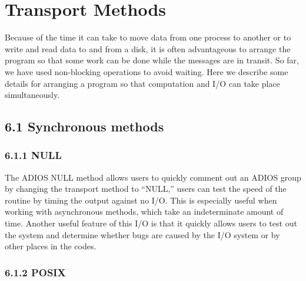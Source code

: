 \vspace{22pt}
\section{Transport Methods}

\vspace{24pt}
\leftskip=0pt
Because of the time it can take to move data from one process to another or to 
write and read data to and from a disk, it is often advantageous to arrange the 
program so that some work can be done while the messages are in transit. So far, 
we have used non-blocking operations to avoid waiting. Here we describe some details 
for arranging a program so that computation and I/O can take place simultaneously.\label{HToc84890256}\label{HToc212016632}\label{HToc212016874}\label{HToc182553380}

\vspace{24pt}
\subsection*{{\large 6.1 }{\large \textbf{Synchronous methods\label{HToc84890257}\label{HToc212016633}\label{HToc212016875}\label{HToc182553381}}}}

\vspace{10pt}
\subsubsection*{{\large \textbf{6.1.1 NULL}}}

\vspace{10pt}
The ADIOS NULL method allows users to quickly comment out an ADIOS group by changing 
the transport method to ``NULL,'' users can test the speed of the routine by timing 
the output against no I/O. This is especially useful when working with asynchronous 
methods, which take an indeterminate amount of time.  Another useful feature of 
this I/O is that it quickly allows users to test out the system and determine whether 
bugs are caused by the I/O system or by other places in the codes.\label{HToc84890258}\label{HToc212016634}\label{HToc212016876}\label{HToc182553382}

\vspace{10pt}
\subsubsection*{{\large \textbf{6.1.2 POSIX}}}

